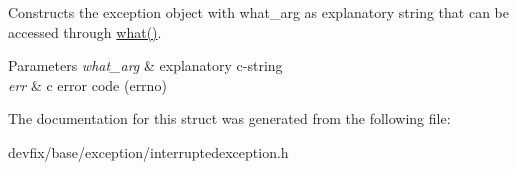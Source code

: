 Constructs the exception object with what\+\_\+arg as explanatory string that can be accessed through \hyperlink{structdevfix_1_1base_1_1baseexception_a10cc739c08d7d38b89abea342824396f}{what()}. 
\begin{DoxyParams}{Parameters}
{\em what\+\_\+arg} & explanatory c-\/string \\
\hline
{\em err} & c error code (errno) \\
\hline
\end{DoxyParams}


The documentation for this struct was generated from the following file\+:\begin{DoxyCompactItemize}
\item 
devfix/base/exception/interruptedexception.\+h\end{DoxyCompactItemize}
